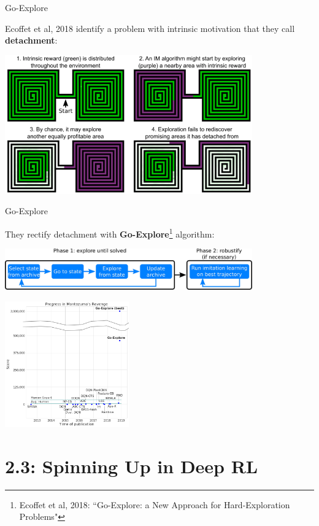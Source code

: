 \documentclass[9pt]{beamer}
\begin{document}
\begin{frame}{Go-Explore}

Ecoffet et al, 2018 identify a problem with intrinsic motivation that they call \textbf{detachment}:

\begin{center}
\includegraphics[width=0.8\textwidth]{p2-detach}
\end{center}

\end{frame}

\begin{frame}{Go-Explore}

They rectify detachment with \textbf{Go-Explore}\footnote{Ecoffet et al, 2018: ``Go-Explore: a New Approach for Hard-Exploration Problems"} algorithm:

\begin{center}
\includegraphics[width=0.8\textwidth]{p2-go-explore}

\includegraphics[width=0.4\textwidth]{p2-go-explore2}
\end{center}

\end{frame}


\section{2.3: Spinning Up in Deep RL}
\end{document}

